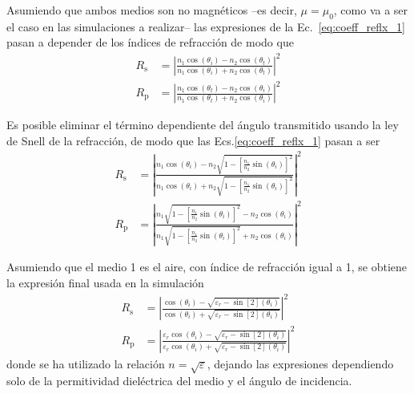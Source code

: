 Asumiendo que ambos medios son no magnéticos --es decir, $\mu = \mu_0$, como va a ser el caso en las simulaciones a realizar-- las expresiones de la Ec.~\eqref{eq:coeff_reflx_1} pasan a depender de los índices de refracción de modo que
\begin{equation}
    \label{eq:coeff_reflx_1}
    \begin{aligned}
        R_\mathrm{s} &= \left|\frac{n_1 \cos(\theta_i) - n_2\cos(\theta_t)}{n_1 \cos(\theta_i) + n_2\cos(\theta_t)}\right|^2\\
        R_\mathrm{p} &= \left|\frac{n_1 \cos(\theta_t) - n_2\cos(\theta_i)}{n_1 \cos(\theta_t) + n_2\cos(\theta_i)}\right|^2
    \end{aligned}
\end{equation}

Es posible eliminar el término dependiente del ángulo transmitido usando la ley de Snell de la refracción, de modo que las Ecs.\eqref{eq:coeff_reflx_1} pasan a ser
\begin{equation}
    \label{eq:coeff_reflx_2}
    \begin{aligned}
        R_\mathrm{s} &= \left|\frac{n_1 \cos(\theta_i) - n_2\sqrt{1 - \left[ \frac{n_1}{n_2}\sin(\theta_i)\right]^2}}{n_1 \cos(\theta_i) + n_2\sqrt{1 - \left[ \frac{n_1}{n_2}\sin(\theta_i)\right]^2}}\right|^2\\
        R_\mathrm{p} &= \left|\frac{n_1 \sqrt{1 - \left[ \frac{n_1}{n_2}\sin(\theta_i)\right]^2} - n_2\cos(\theta_i)}{n_1 \sqrt{1 - \left[ \frac{n_1}{n_2}\sin(\theta_i)\right]^2} + n_2\cos(\theta_i)}\right|^2
    \end{aligned}
\end{equation}

Asumiendo que el medio 1 es el aire, con índice de refracción igual a 1, se obtiene la expresión final usada en la simulación
\begin{equation}
    \label{eq:coeff_reflx_3}
    \begin{aligned}
        R_\mathrm{s} &= \left|\frac{\cos(\theta_i) - \sqrt{\varepsilon_r - \sin[2](\theta_i)}}{\cos(\theta_i) + \sqrt{\varepsilon_r - \sin[2](\theta_i)}}\right|^2\\
        R_\mathrm{p} &= \left|\frac{\varepsilon_r\cos(\theta_i) - \sqrt{\varepsilon_r - \sin[2](\theta_i)}}{\varepsilon_r\cos(\theta_i) + \sqrt{\varepsilon_r - \sin[2](\theta_i)}}\right|^2
    \end{aligned}
\end{equation}
donde se ha utilizado la relación $n = \sqrt{\varepsilon}$, dejando las expresiones dependiendo solo de la permitividad dieléctrica del medio y el ángulo de incidencia.

